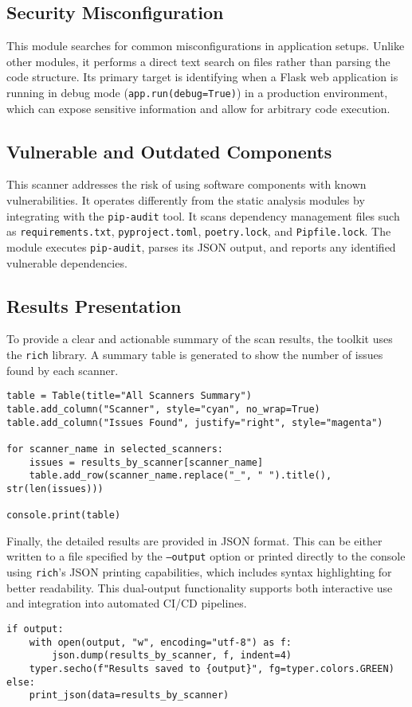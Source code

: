 \subsection{Security Misconfiguration}
This module searches for common misconfigurations in application setups. Unlike other modules, it performs a direct text search on files rather than parsing the code structure. Its primary target is identifying when a Flask web application is running in debug mode (\texttt{app.run(debug=True)}) in a production environment, which can expose sensitive information and allow for arbitrary code execution.

\subsection{Vulnerable and Outdated Components}
This scanner addresses the risk of using software components with known vulnerabilities. It operates differently from the static analysis modules by integrating with the \texttt{pip-audit} tool. It scans dependency management files such as \texttt{requirements.txt}, \texttt{pyproject.toml}, \texttt{poetry.lock}, and \texttt{Pipfile.lock}. The module executes \texttt{pip-audit}, parses its JSON output, and reports any identified vulnerable dependencies.

\subsection{Results Presentation}


To provide a clear and actionable summary of the scan results, the toolkit uses the \texttt{rich} library. A summary table is generated to show the number of issues found by each scanner.

\begin{verbatim}
table = Table(title="All Scanners Summary")
table.add_column("Scanner", style="cyan", no_wrap=True)
table.add_column("Issues Found", justify="right", style="magenta")

for scanner_name in selected_scanners:
    issues = results_by_scanner[scanner_name]
    table.add_row(scanner_name.replace("_", " ").title(), str(len(issues)))

console.print(table)
\end{verbatim}

Finally, the detailed results are provided in JSON format. This can be either written to a file specified by the \texttt{--output} option or printed directly to the console using \texttt{rich}'s JSON printing capabilities, which includes syntax highlighting for better readability. This dual-output functionality supports both interactive use and integration into automated CI/CD pipelines.

\begin{verbatim}
if output:
    with open(output, "w", encoding="utf-8") as f:
        json.dump(results_by_scanner, f, indent=4)
    typer.secho(f"Results saved to {output}", fg=typer.colors.GREEN)
else:
    print_json(data=results_by_scanner)
\end{verbatim}